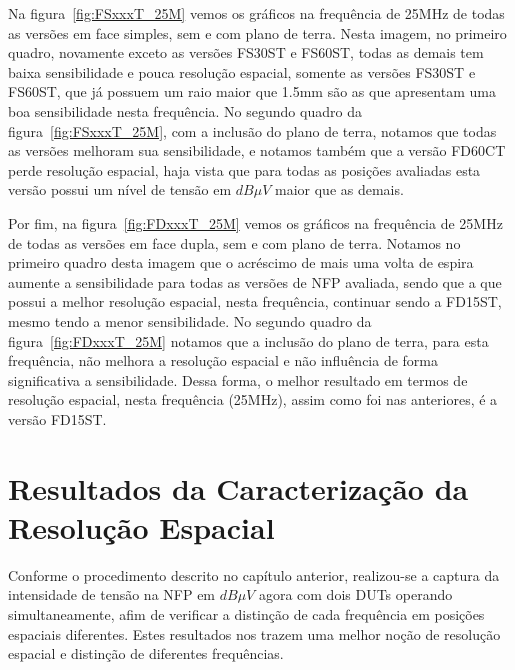 Na figura~\ref{fig:FSxxxT_25M} vemos os gráficos na frequência de 25MHz de todas as versões em face simples, sem e com plano de terra. Nesta imagem, no primeiro quadro, novamente exceto as versões FS30ST e FS60ST, todas as demais tem baixa sensibilidade e pouca resolução espacial, somente as versões FS30ST e FS60ST, que já possuem um raio maior que 1.5mm são as que apresentam uma boa sensibilidade nesta frequência. No segundo quadro da figura~\ref{fig:FSxxxT_25M}, com a inclusão do plano de terra, notamos que todas as versões melhoram sua sensibilidade, e notamos também que a versão FD60CT perde resolução espacial, haja vista que para todas as posições avaliadas esta versão possui um nível de tensão em $dB \mu V$ maior que as demais. 

Por fim, na figura~\ref{fig:FDxxxT_25M} vemos os gráficos na frequência de 25MHz de todas as versões em face dupla, sem e com plano de terra. Notamos no primeiro quadro desta imagem que o acréscimo de mais uma volta de espira aumente a sensibilidade para todas as versões de NFP avaliada, sendo que a que possui a melhor resolução espacial, nesta frequência, continuar sendo a FD15ST, mesmo tendo a menor sensibilidade. No segundo quadro da figura~\ref{fig:FDxxxT_25M} notamos que a inclusão do plano de terra, para esta frequência, não melhora a resolução espacial e não influência de forma significativa a sensibilidade. Dessa forma, o melhor resultado em termos de resolução espacial, nesta frequência (25MHz), assim como foi nas anteriores, é a versão FD15ST.


\section{Resultados da Caracterização da Resolução Espacial}
Conforme o procedimento descrito no capítulo anterior, realizou-se a captura da intensidade de tensão na NFP em $dB \mu V$ agora com dois DUTs operando simultaneamente, afim de verificar a distinção de cada frequência em posições espaciais diferentes. Estes resultados nos trazem uma melhor noção de resolução espacial e distinção de diferentes frequências.

